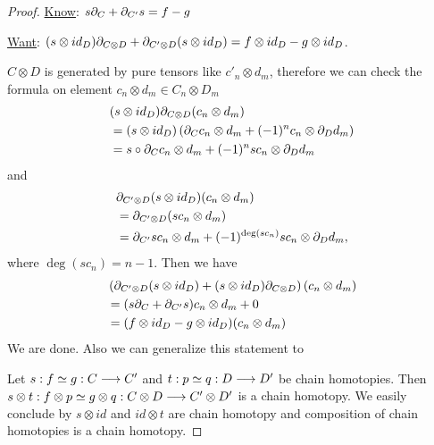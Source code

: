 \documentclass[11pt]{book} %
\begin{document}
\begin{proof}
\underline{Know}: $ s{\partial}_{C}+{\partial}_{C'} s=f-g$

\underline{Want}: $(s\otimes id_D){\partial}_{C\otimes D} +{\partial}_{C'\otimes D} (s\otimes id_D)=f\otimes id_D-g\otimes id_D$. 

$C\otimes D$ is generated by pure tensors like $c'_n\otimes d_m$, therefore we can  check the formula on element $c_n\otimes d_m\in C_n\otimes D_m$
$$
\begin{aligned}
&(s\otimes id_D){\partial}_{C\otimes D}(c_n\otimes d_m)\\
&=(s\otimes id_D)\left({\partial}_C c_n\otimes d_m +(-1)^n c_n\otimes{\partial}_D d_m\right)\\
&=s\circ {\partial}_C c_n\otimes d_m+(-1)^n s c_n\otimes {\partial}_D d_m
\end{aligned}
$$
and
$$
\begin{aligned}
&{\partial}_{C'\otimes D} (s\otimes id_D)(c_n\otimes d_m)\\
&={\partial}_{C'\otimes D} (s c_n\otimes d_m)\\
&= {\partial}_{C'} s c_n \otimes d_m+(-1)^{\deg(sc_n)}sc_n\otimes {\partial}_D d_m,
\end{aligned}
$$
where $\deg (sc_n)=n-1$. Then we have
$$
\begin{aligned}
&\left({\partial}_{C'\otimes D} (s\otimes id_D)+(s\otimes id_D){\partial}_{C\otimes D}\right) (c_n\otimes d_m)\\
&=(s{\partial}_C+{\partial}_{C'} s)c_n \otimes d_m+0\\
&=(f\otimes id_D-g\otimes id_D)(c_n\otimes d_m)
\end{aligned}
$$
We are done. Also we can generalize this statement to 

 Let $s:  f \simeq g: C\longrightarrow C'$ and  $t:  p \simeq q: D\longrightarrow D'$ be chain homotopies. Then $s\otimes t :f\otimes p  \simeq g \otimes q : C\otimes D \longrightarrow C' \otimes D'$ is a chain homotopy. We easily conclude by $s\otimes id$ and $id\otimes t$ are chain homotopy and composition of chain homotopies is a chain homotopy.
\end{proof}
\end{document}
